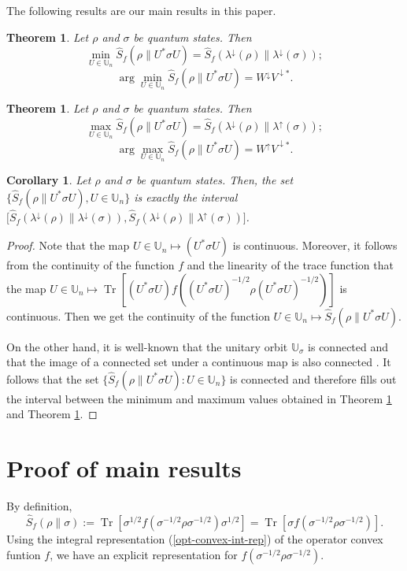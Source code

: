 \documentclass[10pt,reqno]{amsart}
\theoremstyle{break-italic}
\theoremstyle{break-italic}
\theoremstyle{break-italic}
\theoremstyle{break-italic}
\theoremstyle{break-italic}
\theoremstyle{break-italic}
\theoremstyle{break-italic}
\theoremstyle{break-italic}
\newtheorem{theorem}[satz]{Theorem}
\newtheorem{corollary}[satz]{Corollary}
\theoremstyle{break-roman}
\theoremstyle{standard}
\theoremstyle{varthm-roman}
\theoremstyle{varthm-italic}
\theoremstyle{varthm-roman-break}
\theoremstyle{varthm-italic-break}
\theoremstyle{varthm-roman-no-punctuation}
\theoremstyle{varthm-italic-no-punctuation}
\numberwithin{equation}{section}
\begin{document}
The following results are our main results in this paper.
\begin{theorem}\label{min-crnd} Let $\rho$ and $\sigma$ be quantum states. Then
$$ 
\min_{U\in\mathbb{U}_n} \widehat{S}_f(\rho\|U^*\sigma U)= \widehat{S}_f(\lambda^\downarrow(\rho)\|\lambda^\downarrow(\sigma));$$
$$\arg\min_{U\in\mathbb{U}_n} \widehat{S}_f(\rho\|U^*\sigma U)=W^\downarrow V^{\downarrow*}.$$
\end{theorem}

\begin{theorem}\label{max-crnd} Let $\rho$ and $\sigma$ be quantum states. Then
$$
\max_{U\in\mathbb{U}_n} \widehat{S}_f(\rho\|U^*\sigma U)= \widehat{S}_f(\lambda^\downarrow(\rho)\|\lambda^\uparrow(\sigma));$$
$$\arg\max_{U\in\mathbb{U}_n} \widehat{S}_f(\rho\|U^*\sigma U)=W^\uparrow V^{\downarrow*}.$$
\end{theorem}

\begin{corollary} \label{coro-f-diverg-interval} 		
Let  $\rho$ and $ \sigma$ be quantum states. Then,  the set $\Big\{\widehat{S}_f(\rho\|U^*\sigma U), U\in \mathbb U_n\Big\}$ is exactly the interval $\Big[\widehat{S}_f(\lambda^\downarrow(\rho)\|\lambda^\downarrow(\sigma)), \widehat{S}_f(\lambda^\downarrow(\rho)\|\lambda^\uparrow(\sigma))\Big]$.
	\end{corollary}
	\begin{proof}
Note that the map  $U\in \mathbb U_n \longmapsto (U^*\sigma U)$ is continuous. Moreover, it follows from the continuity of the function $f$ and the linearity of the trace function that the map $U\in \mathbb U_n \longmapsto  \operatorname{Tr}[(U^*\sigma U) f((U^*\sigma U)^{-1/2}\rho (U^*\sigma U)^{-1/2})]$ is continuous. Then we get the continuity of the function $U\in \mathbb U_n \longmapsto \widehat{S}_f(\rho\|U^*\sigma U)$. 
  
On the other hand,  it is well-known that the unitary orbit $\mathbb{U}_\sigma$ is connected and that the image of a connected set under a continuous map is also connected \cite[Theorem 4.22]{Ru}. It follows that the set $\Big\{\widehat{S}_f(\rho\|U^*\sigma U): U\in \mathbb U_n\Big\}$ is connected and therefore fills out the interval between the minimum and maximum values obtained in Theorem \ref{min-crnd} and Theorem \ref{max-crnd}.     
	\end{proof}
	
\section{Proof of main results}\label{sec:proofs}
By definition, 
\begin{equation}
\widehat{S}_f(\rho\|\sigma):=\operatorname{Tr}\left[\sigma^{1/2}f(\sigma^{-1/2}\rho\sigma^{-1/2})\sigma^{1/2}\right]=\operatorname{Tr}\left[\sigma f\left(\sigma^{-1/2}\rho\sigma^{-1/2}\right)\right].
\end{equation}
Using the integral representation (\ref{opt-convex-int-rep}) of the operator convex funtion $f$, we have an explicit representation for $f(\sigma^{-1/2}\rho\sigma^{-1/2})$.
\end{document}

